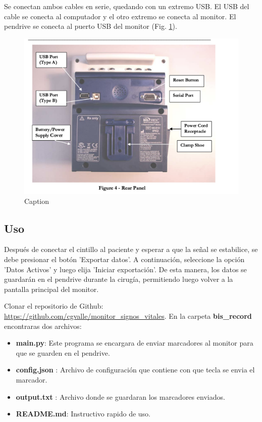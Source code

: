\documentclass{article}
\begin{document}
Se conectan ambos cables en serie, quedando con un extremo USB. El USB del cable se conecta al computador y el otro extremo se conecta al monitor. El pendrive se conecta al puerto USB del monitor (Fig. \ref{fig:bis_rear_panel}).


\begin{figure}
	\centering
    \includegraphics[scale=0.5]{img/bis_rear_panel.png}
    \caption{Caption}
	\label{fig:bis_rear_panel}
\end{figure}


\subsection{Uso}

Después de conectar el cintillo al paciente y esperar a que la señal se estabilice, se debe presionar el botón 'Exportar datos'. A continuación, seleccione la opción 'Datos Activos' y luego elija 'Iniciar exportación'. De esta manera, los datos se guardarán en el pendrive durante la cirugía, permitiendo luego volver a la pantalla principal del monitor.


Clonar el repositorio de Github: \url{https://github.com/cgvalle/monitor_signos_vitales}. En la carpeta \textbf{bis\_record} encontraras dos archivos:

\begin{itemize}
	\item \textbf{main.py}: Este programa se encargara de enviar marcadores al monitor para que se guarden en el pendrive.
	\item \textbf{config.json }: Archivo de configuración que contiene con que tecla se envia el marcador.
	\item \textbf{output.txt} : Archivo donde se guardaran los marcadores enviados.
	\item \textbf{README.md}: Instructivo rapido de uso.
\end{itemize}
\end{document}
